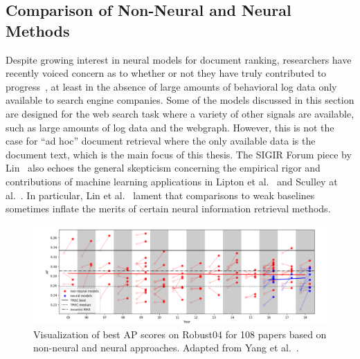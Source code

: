 \subsection{Comparison of Non-Neural and Neural Methods}

Despite growing interest in neural models for document ranking, researchers have recently voiced concern as to whether or not they have truly contributed to progress~\cite{lin2019neural}, at least in the absence of large amounts of behavioral log data only available to search engine companies.
Some of the models discussed in this section are designed for the web search task where a variety of other signals are available, such as large amounts of log data and the webgraph.
However, this is not the case for ``ad hoc'' document retrieval where the only available data is the document text, which is the main focus of this thesis.
The SIGIR Forum piece by Lin~\cite{lin2019neural} also echoes the general skepticism concerning the empirical rigor and contributions of machine learning applications in Lipton et al.~\cite{lipton2018troubling} and Sculley at al.~\cite{sculley2018winner}.
In particular, Lin et al.~\cite{lin2019neural} lament that comparisons to weak baselines sometimes inflate the merits of certain neural information retrieval methods.

\begin{figure}[b!]
\centering
  \includegraphics[width=6.5in]{neural_robust04.png}
\caption{Visualization of best AP scores on Robust04 for 108 papers based on non-neural and neural approaches. Adapted from Yang et al.~\cite{Yang_etal_SIGIR2019}.}
\label{fig:neural_robust04}
\end{figure}

